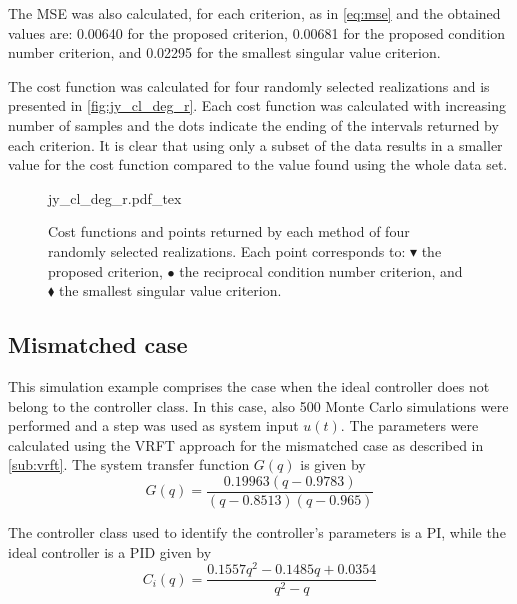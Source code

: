 The MSE was also calculated, for each criterion, as in \eqref{eq:mse} and the obtained values are: 0.00640 for the proposed criterion, 0.00681 for the proposed condition number criterion, and 0.02295 for the smallest singular value criterion.

The cost function was calculated for four randomly selected realizations and is presented in \autoref{fig:jy_cl_deg_r}.
Each cost function was calculated with increasing number of samples and the dots indicate the ending of the intervals returned by each criterion.
It is clear that using only a subset of the data results in a smaller value for the cost function compared to the value found using the whole data set.
\begin{figure}[h!]
  \centering
  \def\svgwidth{\columnwidth}
  {\footnotesize{jy_cl_deg_r.pdf_tex}}
  \caption{\label{fig:jy_cl_deg_r} Cost functions and points returned by each method of four randomly selected realizations. Each point corresponds to: $\blacktriangledown$ the proposed criterion, $\bullet$ the reciprocal condition number criterion, and $\blacklozenge$ the smallest singular value criterion.}
\end{figure}

%
%

\subsection{Mismatched case}
This simulation example comprises the case when the ideal controller does not belong to the controller class.
In this case, also 500 Monte Carlo simulations were performed and a step was used as system input $u(t)$.
The parameters were calculated using the VRFT approach for the mismatched case as described in \autoref{sub:vrft}.
The system transfer function $G(q)$ is given by
\[
	G(q) = \frac{0.19963 (q-0.9783)}{(q-0.8513) (q-0.965)}
\]

The controller class used to identify the controller's parameters is a PI, while the ideal controller is a PID given by
\[
	C_i(q) = \frac{0.1557 q^2 - 0.1485 q + 0.0354}{q^2 - q}
\]

